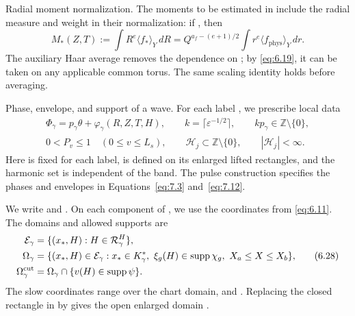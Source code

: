 Radial moment normalization. The moments to be estimated in
 include the radial measure and weight in
their normalization: if
, then
\begin{equation}
  M_*(Z,T):=\int R^e\langle f_*\rangle_Y\,dR
  =Q^{a_f-(e+1)/2}\int r^e\langle f_{\mathrm{phys}}\rangle_Y\,dr.
  \tag{6.26}\label{eq:6.26}
\end{equation}
The auxiliary Haar average removes the dependence on
; by \eqref{eq:6.19}, it can be taken on any applicable
common torus. The same scaling identity holds before averaging.

Phase, envelope, and support of a wave. For each label
, we prescribe local data
\begin{equation}
  \begin{gathered}
    \Phi_\gamma=p_\gamma\theta+\varphi_\gamma(R,Z,T,H),
    \qquad k=\lceil\varepsilon^{-1/2}\rceil,
    \qquad kp_\gamma\in\mathbb Z\setminus\{0\},\\
    0<P_v\le1\quad(0\le v\le L_s),
    \qquad \mathscr H_j\subset\mathbb Z\setminus\{0\},
    \qquad |\mathscr H_j|<\infty.
  \end{gathered}
  \tag{6.27}\label{eq:6.27}
\end{equation}
Here  is fixed for each label,
 is defined on its enlarged lifted
rectangles, and the harmonic set  is
independent of the band. The pulse construction specifies the phases and
envelopes in Equations~\eqref{eq:7.3} and~\eqref{eq:7.12}.

We write  and
. On each component
of , we use the coordinates
 from \eqref{eq:6.11}. The domains and allowed
supports are
\begin{equation}
  \begin{aligned}
    \mathcal E_\gamma
      &=\{(x_*,H):H\in\mathcal R_\gamma^H\},\\
    \Omega_\gamma
      &=\{(x_*,H)\in\mathcal E_\gamma:x_*\in K_\gamma^*,
        \ \xi_g(H)\in\operatorname{supp}\chi_g,\ X_a\le X\le X_b\},\\
    \Omega_\gamma^{\mathrm{cut}}
      &=\Omega_\gamma\cap\{v(H)\in\operatorname{supp}\psi\}.
  \end{aligned}
  \tag{6.28}\label{eq:6.28}
\end{equation}
The slow coordinates range over the chart domain, and
. Replacing the closed rectangle in
 by
 gives the open enlarged domain
.

